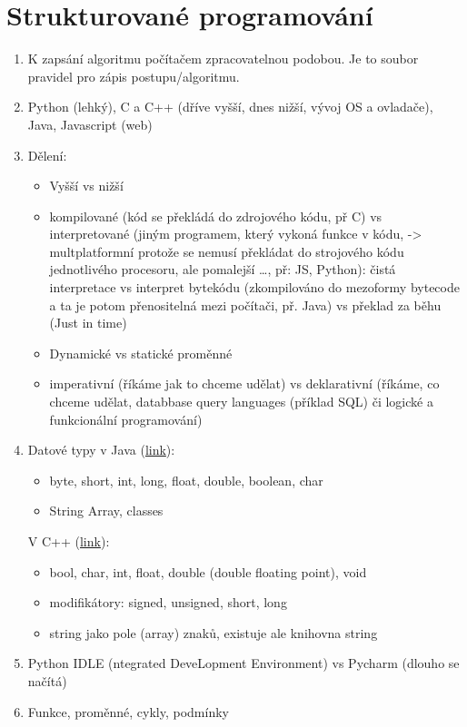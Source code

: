 \documentclass[12pt]{article}
\begin{document}
\section{Strukturované programování}
\label{sec:program_jazyk}
\begin{enumerate}
\item K zapsání algoritmu počítačem zpracovatelnou podobou. Je to soubor pravidel pro zápis postupu/algoritmu.
\item Python (lehký), C a C++ (dříve vyšší, dnes nižší, vývoj OS a ovladače), Java, Javascript (web)
\item Dělení: 
\begin{itemize}
\item Vyšší vs nižší
\item kompilované (kód se překládá do zdrojového kódu, př C) vs interpretované (jiným programem, který vykoná funkce v kódu, -> multplatformní protože se nemusí překládat do strojového kódu jednotlivého procesoru, ale pomalejší \dots, př: JS, Python): čistá interpretace vs interpret bytekódu (zkompilováno do mezoformy bytecode a ta je potom přenositelná mezi počítači, př. Java) vs překlad za běhu (Just in time)
\item Dynamické vs statické proměnné
\item imperativní (říkáme jak to chceme udělat) vs deklarativní (říkáme, co chceme udělat, databbase query languages (příklad SQL) či logické a funkcionální programování)
\end{itemize}
\item Datové typy v Java (\href{https://www.w3schools.com/java/java_data_types.asp}{link}):
\begin{itemize}
\item  byte, short, int, long, float, double, boolean, char
\item  String Array, classes
\end{itemize}
V C++ (\href{https://www.tutorialspoint.com/cplusplus/cpp_data_types.htm}{link}):
\begin{itemize}
\item bool, char, int,  float, double (double floating point), void
\item modifikátory: signed, unsigned, short, long
\item string jako pole (array) znaků, existuje ale knihovna string 
\end{itemize}
\item Python IDLE (ntegrated DeveLopment Environment) vs Pycharm (dlouho se načítá)
\item Funkce, proměnné, cykly, podmínky
\end{enumerate}
\end{document}
